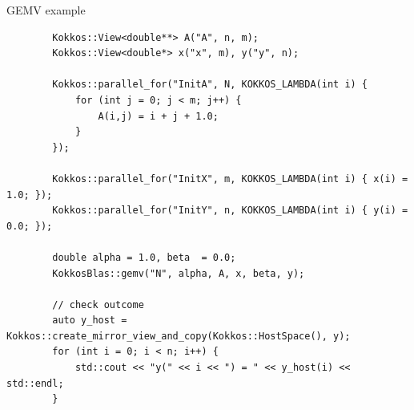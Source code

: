 \documentclass[
    aspectratio=169,
    \createHandout
]{beamer}
\begin{document}
\begin{frame}[fragile]{GEMV example}
    \begin{verbatim}
        Kokkos::View<double**> A("A", n, m);
        Kokkos::View<double*> x("x", m), y("y", n);

        Kokkos::parallel_for("InitA", N, KOKKOS_LAMBDA(int i) {
            for (int j = 0; j < m; j++) {
                A(i,j) = i + j + 1.0;
            }
        });

        Kokkos::parallel_for("InitX", m, KOKKOS_LAMBDA(int i) { x(i) = 1.0; });
        Kokkos::parallel_for("InitY", n, KOKKOS_LAMBDA(int i) { y(i) = 0.0; });

        double alpha = 1.0, beta  = 0.0;
        KokkosBlas::gemv("N", alpha, A, x, beta, y);

        // check outcome
        auto y_host = Kokkos::create_mirror_view_and_copy(Kokkos::HostSpace(), y);
        for (int i = 0; i < n; i++) {
            std::cout << "y(" << i << ") = " << y_host(i) << std::endl;
        }
    \end{verbatim}
\end{frame}
\end{document}
